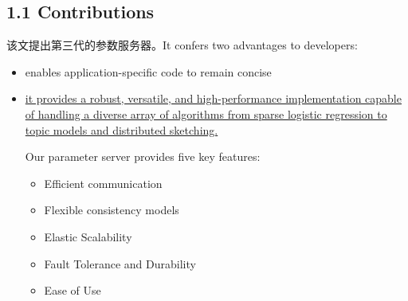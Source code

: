 \documentclass[11pt]{article}
\begin{document}
\subsection{1.1 Contributions}
\label{sec:org6a73973}
该文提出第三代的参数服务器。It confers two advantages to developers:
\begin{itemize}
\item enables application-specific code to remain concise
\item \uline{it provides a robust, versatile, and high-performance implementation capable of handling a diverse array of algorithms from sparse logistic regression to topic models and distributed sketching.}

Our parameter server provides five key features: 
\begin{itemize}
\item Efficient communication
\item Flexible consistency models
\item Elastic Scalability
\item Fault Tolerance and Durability
\item Ease of Use
\end{itemize}
\end{itemize}
\end{document}
